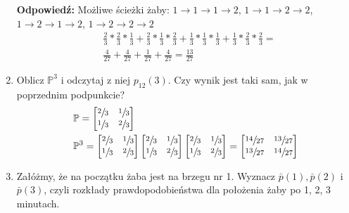 \begin{enumerate}[label=\alph*)]
\textbf{Odpowiedź:} Możliwe ścieżki żaby:
$1\rightarrow 1\rightarrow 1\rightarrow 2$,
$1\rightarrow 1\rightarrow 2\rightarrow 2$,
$1\rightarrow 2\rightarrow 1\rightarrow 2$,
$1\rightarrow 2\rightarrow 2\rightarrow 2$
\begin{align*}
&\frac{2}{3}*\frac{2}{3}*\frac{1}{3}+\frac{2}{3}*\frac{1}{3}*\frac{2}{3}+\frac{1}{3}*\frac{1}{3}*\frac{1}{3}+\frac{1}{3}*\frac{2}{3}*\frac{2}{3}=\\
&\frac{4}{27}+\frac{4}{27}+\frac{1}{27}+\frac{4}{27} = \frac{13}{27}
\end{align*}
\item Oblicz $\mathbb{P}^3$ i odczytaj z niej $p_{12}(3)$. Czy wynik jest taki sam, jak w poprzednim podpunkcie?
\begin{align*}
&\mathbb{P}=\begin{bmatrix}
\sfrac{2}{3}&\sfrac{1}{3}\\
\sfrac{1}{3}&\sfrac{2}{3}
\end{bmatrix}\\
&\mathbb{P}^3=\begin{bmatrix}
\sfrac{2}{3}&\sfrac{1}{3}\\
\sfrac{1}{3}&\sfrac{2}{3}
\end{bmatrix}\begin{bmatrix}
\sfrac{2}{3}&\sfrac{1}{3}\\
\sfrac{1}{3}&\sfrac{2}{3}
\end{bmatrix}\begin{bmatrix}
\sfrac{2}{3}&\sfrac{1}{3}\\
\sfrac{1}{3}&\sfrac{2}{3}
\end{bmatrix}=\begin{bmatrix}
\sfrac{14}{27}&\sfrac{13}{27}\\
\sfrac{13}{27}&\sfrac{14}{27}
\end{bmatrix}
\end{align*}
\item Załóżmy, że na początku żaba jest na brzegu nr 1. Wyznacz $\bar{p}(1), \bar{p}(2)$ i $\bar{p}(3)$, czyli rozkłady prawdopodobieństwa dla położenia żaby po 1, 2, 3 minutach.


\end{enumerate}
